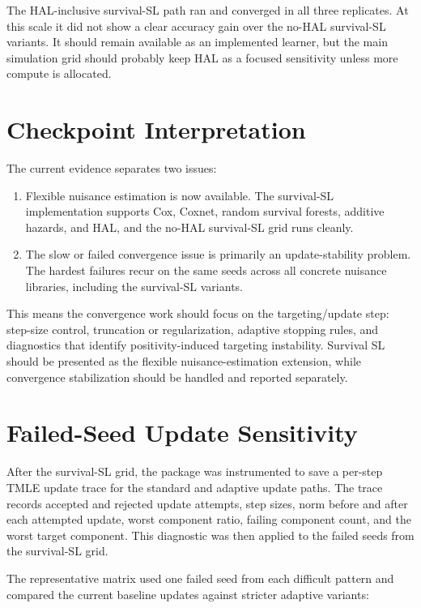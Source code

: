 \documentclass[11pt]{article}
\begin{document}
The HAL-inclusive survival-SL path ran and converged in all three replicates. At this scale it did not show a clear accuracy gain over the no-HAL survival-SL variants. It should remain available as an implemented learner, but the main simulation grid should probably keep HAL as a focused sensitivity unless more compute is allocated.

\section{Checkpoint Interpretation}

The current evidence separates two issues:

\begin{enumerate}
  \item Flexible nuisance estimation is now available. The survival-SL implementation supports Cox, Coxnet, random survival forests, additive hazards, and HAL, and the no-HAL survival-SL grid runs cleanly.
  \item The slow or failed convergence issue is primarily an update-stability problem. The hardest failures recur on the same seeds across all concrete nuisance libraries, including the survival-SL variants.
\end{enumerate}

This means the convergence work should focus on the targeting/update step: step-size control, truncation or regularization, adaptive stopping rules, and diagnostics that identify positivity-induced targeting instability. Survival SL should be presented as the flexible nuisance-estimation extension, while convergence stabilization should be handled and reported separately.

\section{Failed-Seed Update Sensitivity}

After the survival-SL grid, the package was instrumented to save a per-step TMLE update trace for the standard and adaptive update paths. The trace records accepted and rejected update attempts, step sizes, norm before and after each attempted update, worst component ratio, failing component count, and the worst target component. This diagnostic was then applied to the failed seeds from the survival-SL grid.

The representative matrix used one failed seed from each difficult pattern and compared the current baseline updates against stricter adaptive variants:
\end{document}
